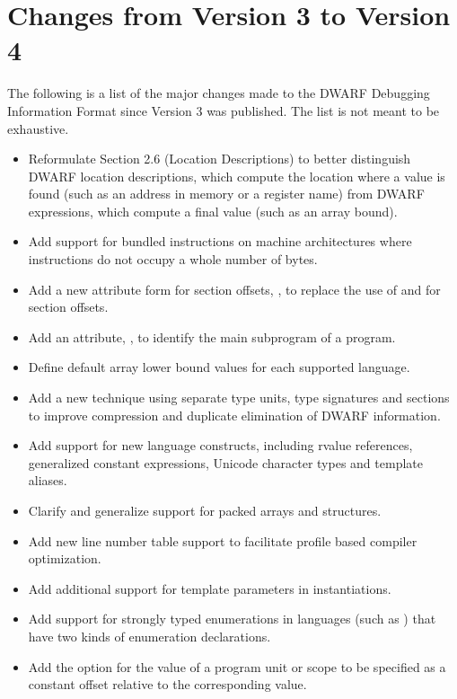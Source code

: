 \section{Changes from Version 3 to Version 4}
The following is a list of the major changes made to the
DWARF Debugging Information Format since Version 3 was
published. The list is not meant to be exhaustive.
\begin{itemize}
\item Reformulate
Section 2.6 (Location Descriptions)
to better distinguish DWARF location descriptions, which
compute the location where a value is found (such as an
address in memory or a register name) from DWARF expressions,
which compute a final value (such as an array bound).
\item Add support for bundled instructions on machine architectures
where instructions do not occupy a whole number of bytes.
\item Add a new attribute form for section offsets,
\DWFORMsecoffsetNAME,
to replace the use of
\DWFORMdatafourNAME{} and \DWFORMdataeightNAME{} for section offsets.
\item Add an attribute, \DWATmainsubprogramNAME, to identify the main subprogram of a
program.
\item Define default array lower bound values for each supported language.
\item Add a new technique using separate type units, type signatures and \COMDAT{} sections to
improve compression and duplicate elimination of DWARF information.
\item Add support for new  language constructs, including rvalue references, generalized
constant expressions, Unicode character types and template aliases.
\item Clarify and generalize support for packed arrays and structures.
\item Add new line number table support to facilitate profile based compiler optimization.
\item Add additional support for template parameters in instantiations.
\item Add support for strongly typed enumerations in languages (such as ) that have two
kinds of enumeration declarations.
\item
Add the option for the \DWAThighpc{} value of a program unit or scope to be
specified as a constant offset relative to the corresponding \DWATlowpc{} value.
\end{itemize}
